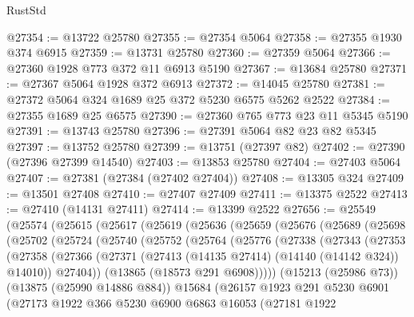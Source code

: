 \begin{lexlean}{RustStd}
\begin{coremodule}
@27354 := @13722 @25780
@27355 := @27354 @5064
@27358 := @27355 @1930 @374 @6915
@27359 := @13731 @25780
@27360 := @27359 @5064
@27366 := @27360 @1928 @773 @372 @11 @6913 @5190
@27367 := @13684 @25780
@27371 := @27367 @5064 @1928 @372 @6913
@27372 := @14045 @25780
@27381 := @27372 @5064 @324 @1689 @25 @372 @5230 @6575 @5262 @2522
@27384 := @27355 @1689 @25 @6575
@27390 := @27360 @765 @773 @23 @11 @5345 @5190
@27391 := @13743 @25780
@27396 := @27391 @5064 @82 @23 @82 @5345
@27397 := @13752 @25780
@27399 := @13751 (@27397 @82)
@27402 := @27390 (@27396 @27399 @14540)
@27403 := @13853 @25780
@27404 := @27403 @5064
@27407 := @27381 (@27384 (@27402 @27404))
@27408 := @13305 @324
@27409 := @13501 @27408
@27410 := @27407 @27409
@27411 := @13375 @2522
@27413 := @27410 (@14131 @27411)
@27414 := @13399 @2522
@27656 := @25549
    (@25574
      (@25615
        (@25617
          (@25619
            (@25636
              (@25659
                (@25676
                  (@25689
                    (@25698
                      (@25702
                        (@25724
                          (@25740
                            (@25752
                              (@25764
                                (@25776
                                  (@27338
                                    (@27343
                                      (@27353
                                        (@27358
                                          (@27366
                                            (@27371
                                              (@27413
                                                (@14135 @27414)
                                                (@14140 (@14142 @324))
                                                @14010))
                                            @27404))
                                        (@13865 (@18573 @291 @6908)))))
                                  (@15213 (@25986 @73))
                                  (@13875 (@25990 @14886 @884))
                                  @15684
                                  (@26157
                                    @1923
                                    @291
                                    @5230
                                    @6901
                                    (@27173
                                      @1922
                                      @366
                                      @5230
                                      @6900
                                      @6863
                                      @16053
                                      (@27181
                                        @1922

\end{coremodule}
\end{lexlean}
